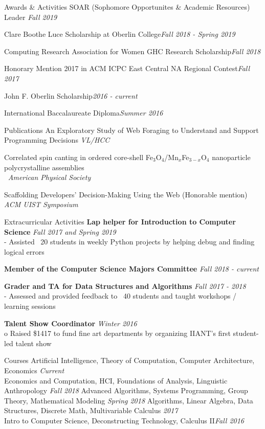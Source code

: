 \documentclass{resume} %
\begin{document}
\begin{rSection}{Awards \& Activities} 
{SOAR (Sophomore Opportunites \& Academic Resources) Leader} \hfill{\em Fall 2019}

{Clare Boothe Luce Scholarship at Oberlin College}\hfill{\em Fall 2018 - Spring 2019}

{Computing Research Association for Women GHC Research Scholarship}\hfill{\em Fall 2018}

{Honorary Mention 2017 in ACM ICPC East Central NA Regional Contest}\hfill{\em Fall 2017}

{John F. Oberlin Scholarship}\hfill{\em 2016 - current}

{International Baccalaureate Diploma}\hfill{\em Summer 2016}
\end{rSection}


\begin{rSection}{Publications}
{An Exploratory Study of Web Foraging to Understand and Support Programming Decisions 
\hfill {\em VL/HCC}}

{Correlated spin canting in ordered core-shell Fe$_3$O$_4$/Mn$_x$Fe$_{3-x}$O$_4$ nanoparticle polycrystalline assemblies  \\
$~$ \hfill {\em American Physical Society}}  

{
Scaffolding Developers’ Decision-Making Using the Web (Honorable mention)
\hfill {\em ACM UIST Symposium}
}

\end{rSection}
\newpage 
\begin{rSection}{Extracurricular Activities}
{\bf Lap helper for Introduction to Computer Science} \hfill {\em Fall 2017 and Spring 2019} \\
- Assisted ~20 students in weekly Python projects by helping debug and finding logical errors 

{\bf Member of the Computer Science Majors Committee} \hfill {\em Fall 2018 - current} 

{\bf Grader and TA for Data Structures and Algorithms} \hfill {\em Fall 2017 - 2018} \\
- Assessed and provided feedback to ~40 students and taught workshops / learning sessions

{\bf Talent Show Coordinator} \hfill {\em Winter 2016} \\
o	Raised \$1417 to fund fine art departments by organizing IIANT’s first student-led talent show
\end{rSection}

\begin{rSection}{Courses}
 {Artificial Intelligence, Theory of Computation, Computer Architecture, Economics} \hfill {\em Current} \\
 {Economics and Computation, HCI, Foundations of Analysis, Linguistic Anthropology} \hfill {\em Fall 2018} 
 {Advanced Algorithms, Systems Programming, Group Theory, Mathematical Modeling} \hfill {\em Spring 2018} 
 Algorithms, Linear Algebra, Data Structures, Discrete Math, Multivariable Calculus \hfill {\em 2017} \\
 {Intro to Computer Science, Deconstructing Technology, Calculus II}\hfill {\em Fall 2016}
\end{rSection}
\end{document}
